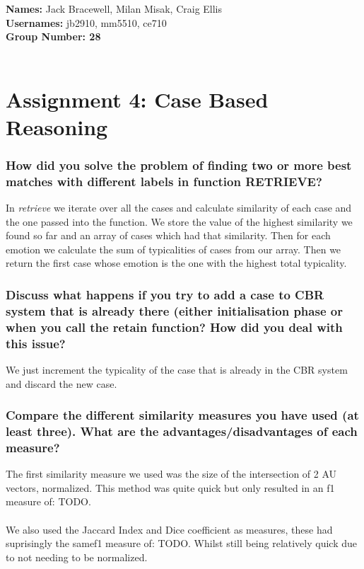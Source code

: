 \documentclass[12pt]{article}
\begin{document}
{\bf Names:} Jack Bracewell, Milan Misak, Craig Ellis \\
{\bf Usernames:} jb2910, mm5510, ce710 \\
{\bf Group Number: 28}  \\ \\

\section*{Assignment 4: Case Based Reasoning}

\subsubsection*{How did you solve the problem of finding two or more best matches with different labels in function RETRIEVE?}

In \emph{retrieve} we iterate over all the cases and calculate similarity of each case and the one passed into the function. We store the value of the highest similarity we found so far and an array of cases which had that similarity. Then for each emotion we calculate the sum of typicalities of cases from our array. Then we return the first case whose emotion is the one with the highest total typicality.


\subsubsection*{Discuss what happens if you try to add a case to CBR system that is already there (either initialisation phase or when you call the retain function? How did you deal with this issue?}

We just increment the typicality of the case that is already in the CBR system and discard the new case. 

\subsubsection*{Compare the different similarity measures you have used (at least three). What are the advantages/disadvantages of each measure?}

The first similarity measure we used was the size of the intersection of 2 AU vectors, normalized. This method was quite quick but only resulted in an f1 measure of: TODO. \\ \\

We also used the Jaccard Index and Dice coefficient as measures, these had suprisingly the samef1 measure of: TODO. Whilst still being relatively quick due to not needing to be normalized.\\\\
\end{document}
